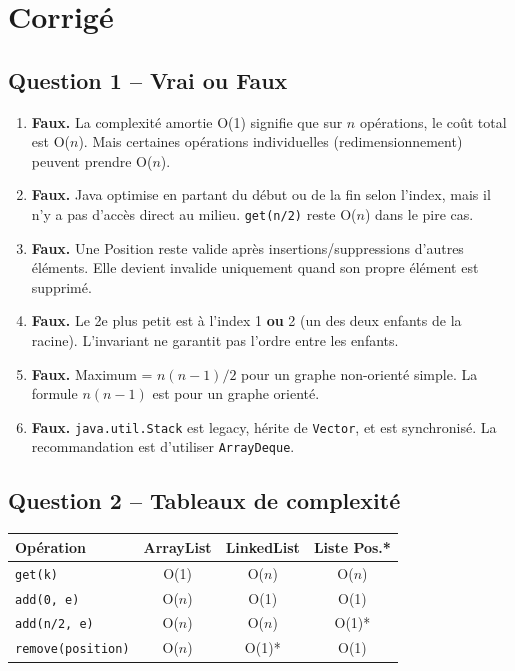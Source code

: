 \documentclass[11pt,letterpaper]{article}
\begin{document}
\newpage

\section*{Corrigé}

\subsection*{Question 1 -- Vrai ou Faux}

\begin{enumerate}[label=\alph*)]
    \item \textbf{Faux.} La complexité amortie O(1) signifie que sur $n$ opérations, le coût total est O($n$). Mais certaines opérations individuelles (redimensionnement) peuvent prendre O($n$).

    \item \textbf{Faux.} Java optimise en partant du début ou de la fin selon l'index, mais il n'y a pas d'accès direct au milieu. \texttt{get(n/2)} reste O($n$) dans le pire cas.

    \item \textbf{Faux.} Une Position reste valide après insertions/suppressions d'autres éléments. Elle devient invalide uniquement quand son propre élément est supprimé.

    \item \textbf{Faux.} Le 2e plus petit est à l'index 1 \textbf{ou} 2 (un des deux enfants de la racine). L'invariant ne garantit pas l'ordre entre les enfants.

    \item \textbf{Faux.} Maximum = $n(n-1)/2$ pour un graphe non-orienté simple. La formule $n(n-1)$ est pour un graphe orienté.

    \item \textbf{Faux.} \texttt{java.util.Stack} est legacy, hérite de \texttt{Vector}, et est synchronisé. La recommandation est d'utiliser \texttt{ArrayDeque}.
\end{enumerate}

\subsection*{Question 2 -- Tableaux de complexité}

\begin{center}
\renewcommand{\arraystretch}{1.5}
\begin{tabular}{|l|c|c|c|}
\hline
\textbf{Opération} & \textbf{ArrayList} & \textbf{LinkedList} & \textbf{Liste Pos.*} \\
\hline
\texttt{get(k)} & O(1) & O($n$) & O($n$) \\
\hline
\texttt{add(0, e)} & O($n$) & O(1) & O(1) \\
\hline
\texttt{add(n/2, e)} & O($n$) & O($n$) & O(1)* \\
\hline
\texttt{remove(position)} & O($n$) & O(1)* & O(1) \\
\hline
\end{tabular}
\end{center}
\end{document}
